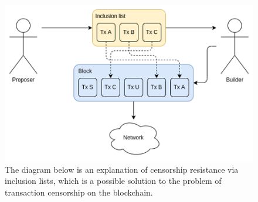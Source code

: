 \documentclass{report}
\begin{document}
  \begin{center}
	\begin{figure}
		\centering
		\includegraphics[width=0.7\linewidth]{Fig/F8}
		\caption{The diagram below is an explanation of censorship resistance via inclusion lists, which is a possible solution to the problem of transaction censorship on the blockchain.}
		\label{fig:f8}
	\end{figure}
\end{center}
\end{document}
